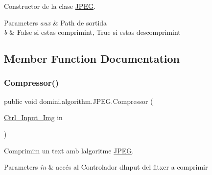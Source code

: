 Constructor de la clase \hyperlink{classdomini_1_1algorithm_1_1JPEG}{J\+P\+EG}. 


\begin{DoxyParams}{Parameters}
{\em aux} & Path de sortida \\
\hline
{\em b} & False si estas comprimint, True si estas descomprimint \\
\hline
\end{DoxyParams}


\subsection{Member Function Documentation}
\mbox{\label{classdomini_1_1algorithm_1_1JPEG_a457ac869c214dffce8a78c0c14c4bf8b}} 
\subsubsection{\texorpdfstring{Compressor()}{Compressor()}}
{\footnotesize\ttfamily public void domini.\+algorithm.\+J\+P\+E\+G.\+Compressor (\begin{DoxyParamCaption}\item[{\hyperlink{classpersistencia_1_1input_1_1Ctrl__Input__Img}{Ctrl\+\_\+\+Input\+\_\+\+Img}}]{in }\end{DoxyParamCaption})\hspace{0.3cm}{\ttfamily [inline]}}



Comprimim un text amb l\textquotesingle{}algoritme \hyperlink{classdomini_1_1algorithm_1_1JPEG}{J\+P\+EG}. 


\begin{DoxyParams}{Parameters}
{\em in} & accés al Controlador d\textquotesingle{}Input del fitxer a comprimir \\
\hline
\end{DoxyParams}
\mbox{\label{classdomini_1_1algorithm_1_1JPEG_a367e6d1e6543bf3d8c847aae36f4b6bf}} 
